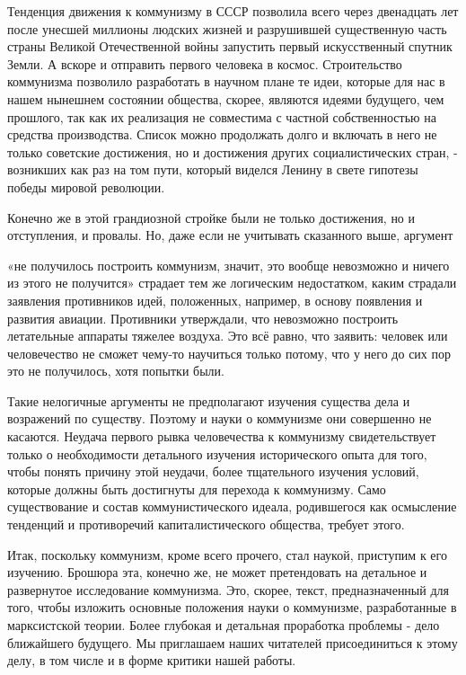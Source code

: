 \documentclass[12pt,a4paper,openany]{book}
\begin{document}
Тенденция движения к коммунизму в СССР позволила всего через двенадцать лет после унесшей миллионы людских жизней и разрушившей существенную часть страны Великой Отечественной войны запустить первый искусственный спутник Земли. А вскоре и отправить первого человека в космос. Строительство коммунизма позволило разработать в научном плане те идеи, которые для нас в нашем нынешнем состоянии общества, скорее, являются идеями будущего, чем прошлого, так как их реализация не совместима с частной собственностью на средства производства. Список можно продолжать долго и включать в него не только советские достижения, но и достижения других социалистических стран, - возникших как раз на том пути, который виделся Ленину в свете гипотезы победы мировой революции.

Конечно же в этой грандиозной стройке были не только достижения, но и отступления, и провалы. Но, даже если не учитывать сказанного выше, аргумент

«не получилось построить коммунизм, значит, это вообще невозможно и ничего из этого не получится» страдает тем же логическим недостатком, каким страдали заявления противников идей, положенных, например, в основу появления и развития авиации. Противники утверждали, что невозможно построить летательные аппараты тяжелее воздуха. Это всё равно, что заявить: человек или человечество не сможет чему-то научиться только потому, что у него до сих пор это не получилось, хотя попытки были.

Такие нелогичные аргументы не предполагают изучения существа дела и возражений по существу. Поэтому и науки о коммунизме они совершенно не касаются. Неудача первого рывка человечества к коммунизму свидетельствует только о необходимости детального изучения исторического опыта для того, чтобы понять причину этой неудачи, более тщательного изучения условий, которые должны быть достигнуты для перехода к коммунизму. Само существование и состав коммунистического идеала, родившегося как осмысление тенденций и противоречий капиталистического общества, требует этого.

Итак, поскольку коммунизм, кроме всего прочего, стал наукой, приступим к его изучению. Брошюра эта, конечно же, не может претендовать на детальное и развернутое исследование коммунизма. Это, скорее, текст, предназначенный для того, чтобы изложить основные положения науки о коммунизме, разработанные в марксистской теории. Более глубокая и детальная проработка проблемы - дело ближайшего будущего. Мы приглашаем наших читателей присоединиться к этому делу, в том числе и в форме критики нашей работы.
\ifSubfilesClassLoaded{\setcounter{page}{14}}{}
\end{document}
